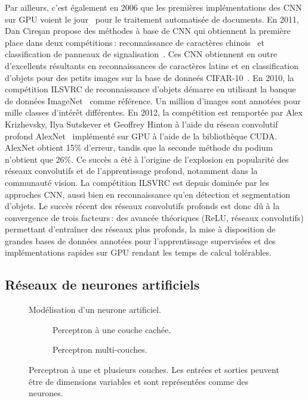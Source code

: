 Par ailleurs, c'est également en 2006 que les premières implémentations des \gls{CNN} sur \gls{GPU} voient le jour~\cite{chellapilla_high_2006} pour le traitement automatisée de documents. En 2011, Dan Cire\c{s}an propose des méthodes à base de \gls{CNN} qui obtiennent la première place dans deux compétitions\,: reconnaissance de caractères chinois~\cite{liu_icdar_2011} et classification de panneaux de signalisation~\cite{stallkamp_german_2011}. Ces \gls{CNN} obtiennent en outre d'excellents résultants en reconnaissances de caractères latins et en classification d'objets pour des petits images sur la base de donneés CIFAR-10~\cite{ciresan_multi-column_2012}. En 2010, la compétition \gls{ILSVRC} de reconnaissance d'objets démarre en utilisant la banque de données ImageNet~\cite{deng_imagenet_2009} comme référence. Un million d'images sont annotées pour mille classes d'intérêt différentes. En 2012, la compétition est remportée par Alex Krizhevsky, Ilya Sutskever et Geoffrey Hinton à l'aide du réseau convolutif profond AlexNet~\cite{krizhevsky_imagenet_2012} implémenté sur \gls{GPU} à l'aide de la bibliothèque \gls{CUDA}. AlexNet obtient 15\% d'erreur, tandis que la seconde méthode du podium n'obtient que 26\%. Ce succès a été à l'origine de l'explosion en popularité des réseaux convolutifs et de l'apprentissage profond, notamment dans la communauté vision. La compétition \gls{ILSVRC} est depuis dominée par les approches \gls{CNN}, aussi bien en reconnaissance qu'en détection et segmentation d'objets. Le succès récent des réseaux convolutifs profonds est donc dû à la convergence de trois facteurs\,: des avancée théoriques (\gls{ReLU}, réseaux convolutifs) permettant d'entraîner des réseaux plus profonds, la mise à disposition de grandes bases de données annotées pour l'apprentissage supervisées et des implémentations rapides sur \gls{GPU} rendant les temps de calcul tolérables.

\subsection{Réseaux de neurones artificiels}

\begin{figure}[t]
  \resizebox{\textwidth}{!}{
  
  }
\caption{Modélisation d'un neurone artificiel.}
\label{fig:neurone}
\end{figure}

\begin{figure}[t]
  \begin{subfigure}[b]{0.5\textwidth}
    \resizebox{\textwidth}{!}{
    
    }
  \caption{Perceptron à une couche cachée.}
  \end{subfigure}%
  \begin{subfigure}[b]{0.5\textwidth}
    \resizebox{\textwidth}{!}{
    
    }
  \caption{Perceptron multi-couches.}
  \end{subfigure}
  \caption{Perceptron à une et plusieurs couches. Les entrées et sorties peuvent être de dimensions variables et sont représentées comme des neurones.}
  \label{fig:perceptron}
\end{figure}

